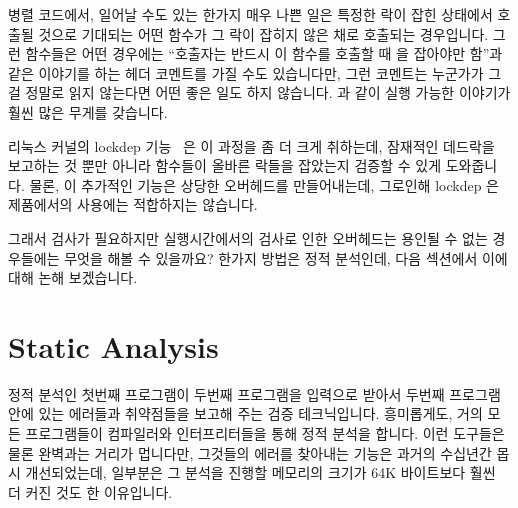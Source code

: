 병렬 코드에서, 일어날 수도 있는 한가지 매우 나쁜 일은 특정한 락이 잡힌 상태에서
호출될 것으로 기대되는 어떤 함수가 그 락이 잡히지 않은 채로 호출되는
경우입니다.
그런 함수들은 어떤 경우에는 ``호출자는 반드시 이 함수를 호출할 때 
을 잡아야만 함''과 같은 이야기를 하는 헤더 코멘트를 가질 수도 있습니다만, 그런
코멘트는 누군가가 그걸 정말로 읽지 않는다면 어떤 좋은 일도 하지 않습니다.
 과 같이 실행 가능한 이야기가 훨씬 많은 무게를
갖습니다.

리눅스 커널의 lockdep
기능~\cite{JonathanCorbet2006lockdep,StevenRostedt2011locdepCryptic} 은 이
과정을 좀 더 크게 취하는데, 잠재적인 데드락을 보고하는 것 뿐만 아니라 함수들이
올바른 락들을 잡았는지 검증할 수 있게 도와줍니다.
물론, 이 추가적인 기능은 상당한 오버헤드를 만들어내는데, 그로인해 lockdep 은
제품에서의 사용에는 적합하지는 않습니다.

그래서 검사가 필요하지만 실행시간에서의 검사로 인한 오버헤드는 용인될 수 없는
경우들에는 무엇을 해볼 수 있을까요?
한가지 방법은 정적 분석인데, 다음 섹션에서 이에 대해 논해 보겠습니다.

\section{Static Analysis}
\label{sec:debugging:Static Analysis}

정적 분석인 첫번째 프로그램이 두번째 프로그램을 입력으로 받아서 두번째 프로그램
안에 있는 에러들과 취약점들을 보고해 주는 검증 테크닉입니다.
흥미롭게도, 거의 모든 프로그램들이 컴파일러와 인터프리터들을 통해 정적 분석을
합니다.
이런 도구들은 물론 완벽과는 거리가 멉니다만, 그것들의 에러를 찾아내는 기능은
과거의 수십년간 몹시 개선되었는데, 일부분은 그 분석을 진행할 메모리의 크기가
64K 바이트보다 훨씬 더 커진 것도 한 이유입니다.
\iffalse

